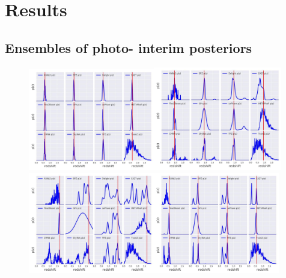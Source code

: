 \section{Results}
\label{sec:results}

\subsection{Ensembles of photo- interim posteriors}

\begin{figure}
\includegraphics[width=0.49\textwidth]{fig/pz_12codes_261931_crop.jpg}\includegraphics[width=0.5\textwidth]{fig/pz_12codes_471167_crop.jpg}\\
\includegraphics[width=0.49\textwidth]{fig/pz_12codes_713178_crop.jpg}\includegraphics[width=0.49\textwidth]{fig/pz_12codes_982747_crop.jpg}

\end{figure}
